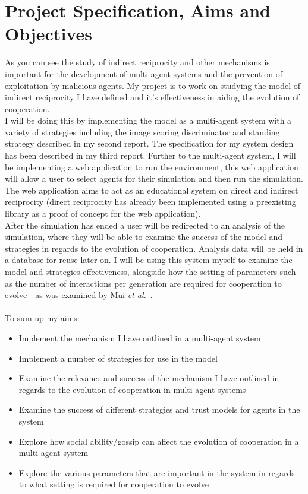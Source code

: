 \documentclass[]{final_report}
\begin{document}
\section{Project Specification, Aims and Objectives}
As you can see the study of indirect reciprocity and other mechanisms is important for the development of multi-agent systems and the prevention of exploitation by malicious agents. My project is to work on studying the model of indirect reciprocity I have defined and it's effectiveness in aiding the evolution of cooperation.\\
I will be doing this by implementing the model as a multi-agent system with a variety of strategies including the image scoring discriminator and standing strategy described in my second report. The specification for my system design has been described in my third report. Further to the multi-agent system, I will be implementing a web application to run the environment, this web application will allow a user to select agents for their simulation and then run the simulation. The web application aims to act as an educational system on direct and indirect reciprocity (direct reciprocity has already been implemented using a preexisting library as a proof of concept for the web application).\\
After the simulation has ended a user will be redirected to an analysis of the simulation, where they will be able to examine the success of the model and strategies in regards to the evolution of cooperation. Analysis data will be held in a database for reuse later on. I will be using this system myself to examine the model and strategies effectiveness, alongside how the setting of parameters such as the number of interactions per generation are required for cooperation to evolve - as was examined by Mui \textit{et al.}~\cite{Mui:2002:NRM:544741.544807}.\\\\
To sum up my aims:
\begin{itemize}
	\item Implement the mechanism I have outlined in a multi-agent system
	\item Implement a number of strategies for use in the model
	\item Examine the relevance and success of the mechanism I have outlined in regards to the evolution of cooperation in multi-agent systems
	\item Examine the success of different strategies and trust models for agents in the system
	\item Explore how social ability/gossip can affect the evolution of cooperation in a multi-agent system
	\item Explore the various parameters that are important in the system in regards to what setting is required for cooperation to evolve
\end{itemize}
\end{document}
